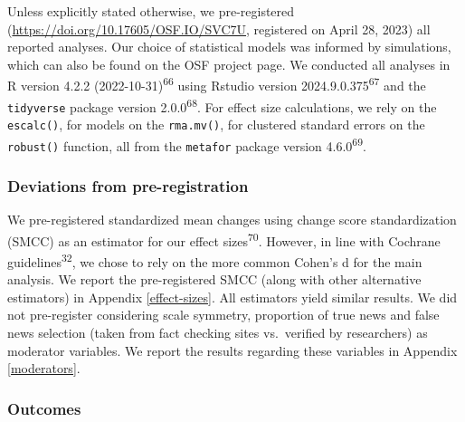 \documentclass[
  man]{apa6}
\begin{document}
Unless explicitly stated otherwise, we pre-registered (\url{https://doi.org/10.17605/OSF.IO/SVC7U}, registered on April 28, 2023) all reported analyses. Our choice of statistical models was informed by simulations, which can also be found on the OSF project page. We conducted all analyses in R version 4.2.2 (2022-10-31)\textsuperscript{66} using Rstudio version 2024.9.0.375\textsuperscript{67} and the \texttt{tidyverse} package version 2.0.0\textsuperscript{68}. For effect size calculations, we rely on the \texttt{escalc()}, for models on the \texttt{rma.mv()}, for clustered standard errors on the \texttt{robust()} function, all from the \texttt{metafor} package version 4.6.0\textsuperscript{69}.

\subsubsection{Deviations from pre-registration}\label{deviations-from-pre-registration}

We pre-registered standardized mean changes using change score standardization (SMCC) as an estimator for our effect sizes\textsuperscript{70}. However, in line with Cochrane guidelines\textsuperscript{32}, we chose to rely on the more common Cohen's d for the main analysis. We report the pre-registered SMCC (along with other alternative estimators) in Appendix \ref{effect-sizes}. All estimators yield similar results. We did not pre-register considering scale symmetry, proportion of true news and false news selection (taken from fact checking sites vs.~verified by researchers) as moderator variables. We report the results regarding these variables in Appendix \ref{moderators}.

\subsubsection{Outcomes}\label{outcomes}
\end{document}
